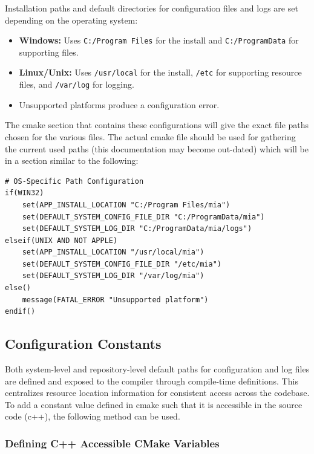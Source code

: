 Installation paths and default directories for configuration files and logs are set depending on the operating system:
\begin{itemize}\itemsep0em
	\item \textbf{Windows:} Uses \texttt{C:/Program Files} for the install and \texttt{C:/ProgramData} for supporting files.
	\item \textbf{Linux/Unix:} Uses \texttt{/usr/local} for the install, \texttt{/etc} for supporting resource files, and \texttt{/var/log} for logging.
	\item Unsupported platforms produce a configuration error.
\end{itemize}
The cmake section that contains these configurations will give the exact file paths chosen for the various files. The actual cmake file should be used for gathering the current used paths (this documentation may become out-dated) which will be in a section similar to the following:
\begin{lstlisting}[style=shellstyle]
# OS-Specific Path Configuration
if(WIN32)
    set(APP_INSTALL_LOCATION "C:/Program Files/mia")
    set(DEFAULT_SYSTEM_CONFIG_FILE_DIR "C:/ProgramData/mia")
    set(DEFAULT_SYSTEM_LOG_DIR "C:/ProgramData/mia/logs")
elseif(UNIX AND NOT APPLE)
    set(APP_INSTALL_LOCATION "/usr/local/mia")
    set(DEFAULT_SYSTEM_CONFIG_FILE_DIR "/etc/mia")
    set(DEFAULT_SYSTEM_LOG_DIR "/var/log/mia")
else()
    message(FATAL_ERROR "Unsupported platform")
endif()
\end{lstlisting}

\subsection{Configuration Constants}

Both system-level and repository-level default paths for configuration and log files are defined and exposed to the compiler through compile-time definitions. This centralizes resource location information for consistent access across the codebase. To add a constant value defined in cmake such that it is accessible in the source code (c++), the following method can be used.

\subsubsection{Defining C++ Accessible CMake Variables}
\label{section:cmake_setup_cpp}

